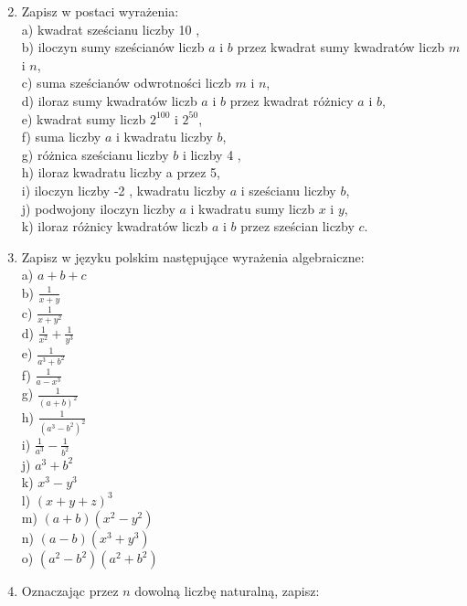 \documentclass[10pt]{article}
\begin{document}
\begin{enumerate}
  \setcounter{enumi}{1}
  \item Zapisz w postaci wyrażenia:\\
a) kwadrat sześcianu liczby 10 ,\\
b) iloczyn sumy sześcianów liczb \(a\) i \(b\) przez kwadrat sumy kwadratów liczb \(m\) i \(n\),\\
c) suma sześcianów odwrotności liczb \(m\) i \(n\),\\
d) iloraz sumy kwadratów liczb \(a\) i \(b\) przez kwadrat różnicy \(a\) i \(b\),\\
e) kwadrat sumy liczb \(2^{100}\) i \(2^{50}\),\\
f) suma liczby \(a\) i kwadratu liczby \(b\),\\
g) różnica sześcianu liczby \(b\) i liczby 4 ,\\
h) iloraz kwadratu liczby a przez 5,\\
i) iloczyn liczby -2 , kwadratu liczby \(a\) i sześcianu liczby \(b\),\\
j) podwojony iloczyn liczby \(a\) i kwadratu sumy liczb \(x\) i \(y\),\\
k) iloraz różnicy kwadratów liczb \(a\) i \(b\) przez sześcian liczby \(c\).
  \item Zapisz w języku polskim następujące wyrażenia algebraiczne:\\
a) \(a+b+c\)\\
b) \(\frac{1}{x+y}\)\\
c) \(\frac{1}{x+y^{2}}\)\\
d) \(\frac{1}{x^{2}}+\frac{1}{y^{3}}\)\\
e) \(\frac{1}{a^{3}+b^{2}}\)\\
f) \(\frac{1}{a-x^{3}}\)\\
g) \(\frac{1}{(a+b)^{2}}\)\\
h) \(\frac{1}{\left(a^{3}-b^{2}\right)^{2}}\)\\
i) \(\frac{1}{a^{3}}-\frac{1}{b^{2}}\)\\
j) \(a^{3}+b^{2}\)\\
k) \(x^{3}-y^{3}\)\\
l) \((x+y+z)^{3}\)\\
m) \((a+b)\left(x^{2}-y^{2}\right)\)\\
n) \((a-b)\left(x^{3}+y^{3}\right)\)\\
o) \(\left(a^{2}-b^{2}\right)\left(a^{2}+b^{2}\right)\)
  \item Oznaczając przez \(n\) dowolną liczbę naturalną, zapisz:\\

\end{enumerate}
\end{document}
